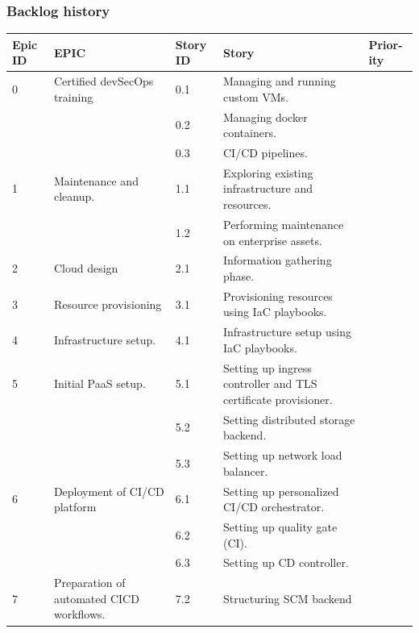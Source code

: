 \subsubsection{Backlog history }
\begin{longtable}[H]{|m{1cm}|m{3cm}|m{1cm}|m{7cm}|m{1.2cm}|}
\hline
 {\textbf{Epic ID}} & {\textbf{EPIC}} & {\textbf{Story ID}} & {\textbf{Story}} & {\textbf{Prior-ity}} \\
 \hline
\endhead
0 & \raggedright Certified devSecOps training &	0.1 &	Managing and running custom VMs. & \\
\cline{3-5}
&   & 0.2 &	Managing docker containers.	& \\
\cline{3-5}
&   & 0.3 &	CI/CD pipelines. & \\
\hline
1 & Maintenance and cleanup. &	1.1	& Exploring existing infrastructure and resources. & \\
\cline{3-5}
&   &	1.2 & Performing maintenance on enterprise assets. & \\

\hline
2 & Cloud design &	2.1 &	Information gathering phase. & \\
\hline
3 & Resource provisioning &	3.1 &	Provisioning resources using IaC playbooks. & \\
\hline
4 & Infrastructure setup. &	4.1 &	Infrastructure setup using IaC playbooks. & \\
\hline
5 & \raggedright Initial PaaS setup. &	5.1 &	Setting up ingress controller and TLS certificate provisioner.	 & \\
\cline{3-5}
&   & 5.2 &	Setting distributed storage backend.	 & \\
\cline{3-5}
&   & 5.3 &	Setting up network load balancer.	 & \\
  \hline
6 & Deployment of CI/CD platform &	6.1 &	Setting up personalized CI/CD orchestrator.	 & \\
\cline{3-5}
&   & 6.2 &	Setting up quality gate (CI).	 & \\
\cline{3-5}
&   & 6.3 & Setting up CD controller.	 & \\
  \hline
7 & \raggedright Preparation of automated CICD workflows. &	7.2 &	Structuring SCM backend	 & \\


\end{longtable}
